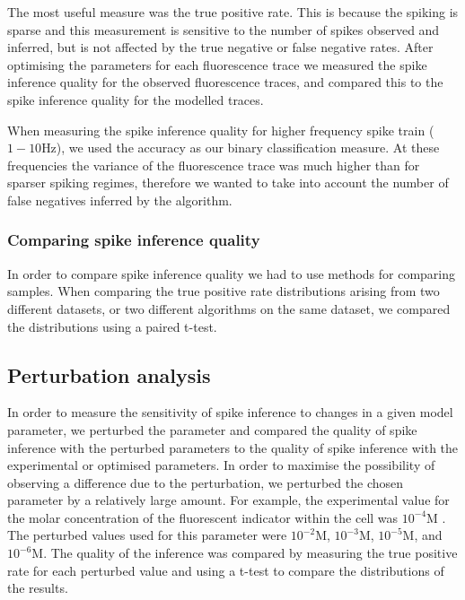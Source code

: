 The most useful measure was the true positive rate. This is because the spiking is sparse and this measurement is sensitive to the number of spikes observed and inferred, but is not affected by the true negative or false negative rates. After optimising the parameters for each fluorescence trace we measured the spike inference quality for the observed fluorescence traces, and compared this to the spike inference quality for the modelled traces.

When measuring the spike inference quality for higher frequency spike train ($1-10$Hz), we used the accuracy as our binary classification measure. At these frequencies the variance of the fluorescence trace was much higher than for sparser spiking regimes, therefore we wanted to take into account the number of false negatives inferred by the algorithm.

\subsubsection{Comparing spike inference quality}
In order to compare spike inference quality we had to use methods for comparing samples. When comparing the true positive rate distributions arising from two different datasets, or two different algorithms on the same dataset, we compared the distributions using a paired t-test. %

\subsection{Perturbation analysis}
In order to measure the sensitivity of spike inference to changes in a given model parameter, we perturbed the parameter and compared the quality of spike inference with the perturbed parameters to the quality of spike inference with the experimental or optimised parameters. In order to maximise the possibility of observing a difference due to the perturbation, we perturbed the chosen parameter by a relatively large amount. For example, the experimental value for the molar concentration of the fluorescent indicator within the cell was $10^{-4}$M  \parencite{maravall}. The perturbed values used for this parameter were $10^{-2}$M, $10^{-3}$M, $10^{-5}$M, and $10^{-6}$M. The quality of the inference was compared by measuring the true positive rate for each perturbed value and using a t-test to compare the distributions of the results.

